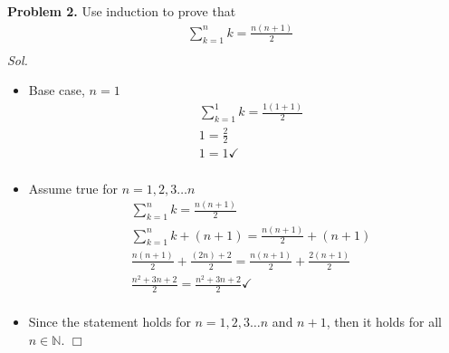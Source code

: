 \documentclass[11pt]{article}
\begin{document}
  \clearpage
  {\bf Problem 2.} Use induction to prove that\begin{align*}
    & \sum_{k=1}^{n} k = \frac{n(n+1)}{2} \\
  \end{align*}
  \textit{ Sol. }
	\begin{itemize}
    \item[] Base case, $n = 1$ \begin{align*}
        & \sum_{k=1}^{1} k = \frac{1(1+1)}{2} \\
        & 1 = \frac{2}{2} \\
        & 1 = 1 \checkmark \\
    \end{align*} 
  \item[] Assume true for $n = 1, 2, 3 \ldots n$ \begin{align*}
      & \sum_{k=1}^{n} k = \frac{n(n+1)}{2} \\
      & \sum_{k=1}^{n} k + (n+1) = \frac{n(n+1)}{2} + (n+1) \\
      & \frac{n(n+1)}{2} + \frac{(2n) + 2}{2} = \frac{n(n+1)}{2} + \frac{2(n+1)}{2} \\
      & \frac {n^{2} + 3n + 2}{2} = \frac{n^{2} + 3n + 2}{2} \checkmark \\
    \end{align*}
  \item[] Since the statement holds for $n = 1, 2, 3 \ldots n$ and $n+1$,
    then it holds for all $n \in \mathbb{N}$. $\Box$
	\end{itemize}
\end{document}
